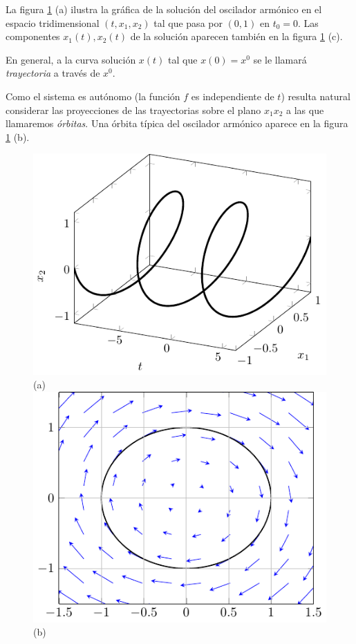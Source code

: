 \documentclass[11pt]{book}
\theoremstyle{definition}
\numberwithin{definition}{section}
\theoremstyle{theorem}
\numberwithin{theorem}{section}
\numberwithin{lemma}{section}
\numberwithin{corollary}{section}
\theoremstyle{plain}
\numberwithin{example}{section}
\begin{document}
La figura \ref{fig:osciladorarmonico} (a) ilustra la gráfica de la solución del oscilador armónico en el espacio tridimensional $(t,x_1,x_2)$ tal que pasa por $(0,1)$ en $t_0 = 0$. Las componentes $x_1(t), x_2(t)$ de la solución aparecen también en la figura \ref{fig:osciladorarmonico} (c).

En general, a la curva solución $x(t)$ tal que $x(0) = x^0$ se le llamará \emph{trayectoria} a través de $x^0$.

Como el sistema es autónomo (la función $f$ es independiente de $t$) resulta natural considerar las proyecciones de las trayectorias sobre el plano $x_1x_2$ a las que llamaremos \emph{órbitas}. Una órbita típica del oscilador armónico aparece en la figura \ref{fig:osciladorarmonico} (b).

\begin{figure}
\centering \label{fig:osciladorarmonico}
    \includegraphics[scale=1.0]{figures/osciladorarmonico-solucion.pdf}\\(a) \\
    \includegraphics[scale=1.0]{figures/osciladorarmonico-orbita.pdf}\\(b) \\ 

\end{figure}
\end{document}
